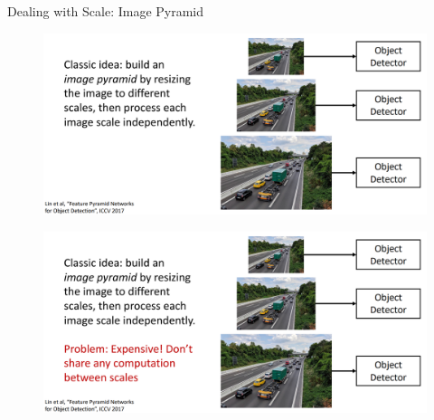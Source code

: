 \begin{frame}[allowframebreaks]{Dealing with Scale: Image Pyramid}
\begin{figure}
\centering
\includegraphics[width=1.0\textwidth,height=1.0\textheight,keepaspectratio]{images/object-detect/scale_2.png}
\end{figure}

\framebreak

\begin{figure}
\centering
\includegraphics[width=1.0\textwidth,height=1.0\textheight,keepaspectratio]{images/object-detect/scale_3.png}
\end{figure}
    
\end{frame}

